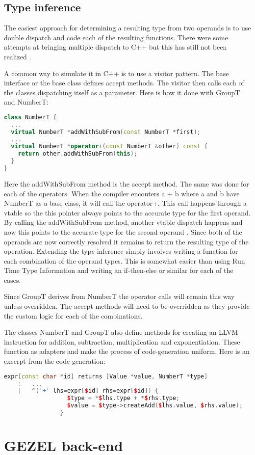 \subsection{Type inference}

The easiest approach for determining a resulting type from two
operands is to use double dispatch and code each of the resulting
functions.  There were some attempts at bringing multiple dispatch to
C++ but this has still not been realized \cite{c++_multi_methods}.

A common way to simulate it in C++ is to use a visitor pattern. The base
interface or the base class defines accept methods. The visitor then calls
each of the classes dispatching itself as a parameter. Here is how it done
with GroupT and NumberT:

\begin{lstlisting}[language=C++]
  class NumberT {
  ...
  virtual NumberT *addWithSubFrom(const NumberT *first);
  ...
  virtual NumberT *operator+(const NumberT &other) const {
    return other.addWithSubFrom(this);
  }
}
\end{lstlisting}

Here the addWithSubFrom method is the accept method.  The same was
done for each of the operators. When the compiler encouters a + b
where a and b have NumberT as a base class, it will call the
operator+. This call happens through a vtable so the this pointer
always points to the accurate type for the first operand. By calling
the addWithSubFrom method, another vtable dispatch happens and now
this points to the accurate type for the second operand
\cite{Eckel}. Since both of the operands are now correctly resolved it
remains to return the resulting type of the operation. Extending the
type inference simply involves writing a function for each combination
of the operand types. This is somewhat easier than using Run Time Type
Information and writing an if-then-else or similar for each of the
cases.

Since GroupT derives from NumberT the operator calls will remain this
way unless overridden. The accept methods will need to be overridden
as they provide the custom logic for each of the combinations.

The classes NumberT and GroupT also define methods for creating an
LLVM instruction for addition, subtraction, multiplication and
exponentiation. These function as adapters and make the process of
code-generation uniform. Here is an excerpt from the code generation:
\begin{lstlisting}[language=C++, morekeywords=expr]
expr[const char *id] returns [Value *value, NumberT *type]
	:	...
	|	^('+' lhs=expr[$id] rhs=expr[$id]) {
                  $type = *$lhs.type + *$rhs.type;
                  $value = $type->createAdd($lhs.value, $rhs.value);
                }
\end{lstlisting}

\section{GEZEL back-end}

